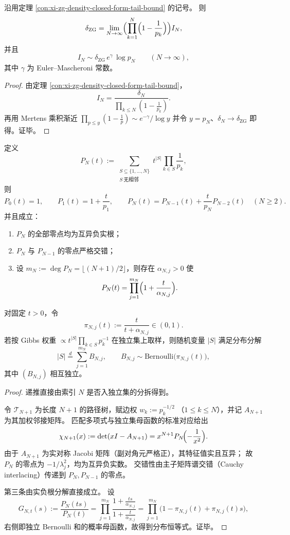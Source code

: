 \begin{corollary}\label{cor:xi-zg-mertens-log-growth}
沿用定理 \ref{con:xi-zg-density-closed-form-tail-bound} 的记号。
则
\[
\delta_{\mathrm{ZG}}
=\lim_{N\to\infty}
\Bigl(\prod_{k=1}^N\Bigl(1-\frac1{p_k}\Bigr)\Bigr)I_N,
\]
并且
\[
I_N\sim \delta_{\mathrm{ZG}}\,e^{\gamma}\,\log p_N
\qquad (N\to\infty),
\]
其中 \(\gamma\) 为 Euler--Mascheroni 常数。
\end{corollary}
\begin{proof}
由定理 \ref{con:xi-zg-density-closed-form-tail-bound}，
\[
I_N=\frac{\delta_N}{\prod_{k\le N}(1-\frac1{p_k})}.
\]
再用 Mertens 乘积渐近
\(
\prod_{p\le y}(1-\frac1p)\sim e^{-\gamma}/\log y
\)
并令 \(y=p_N\)、\(\delta_N\to\delta_{\mathrm{ZG}}\) 即得。证毕。
\end{proof}

\begin{theorem}\label{con:xi-zg-weighted-path-leyang-poisson-binomial}
定义
\[
P_N(t):=\sum_{\substack{S\subseteq\{1,\dots,N\}\\ S\ \mathrm{无相邻}}}
t^{|S|}\prod_{k\in S}\frac1{p_k},
\]
则
\[
P_0(t)=1,\qquad
P_1(t)=1+\frac{t}{p_1},\qquad
P_N(t)=P_{N-1}(t)+\frac{t}{p_N}P_{N-2}(t)\quad(N\ge 2).
\]
并且成立：
\begin{enumerate}
  \item \(P_N\) 的全部零点均为互异负实根；
  \item \(P_N\) 与 \(P_{N-1}\) 的零点严格交错；
  \item 设 \(m_N:=\deg P_N=\lfloor(N+1)/2\rfloor\)，则存在 \(\alpha_{N,j}>0\) 使
  \[
  P_N(t)=\prod_{j=1}^{m_N}\Bigl(1+\frac{t}{\alpha_{N,j}}\Bigr).
  \]
\end{enumerate}
对固定 \(t>0\)，令
\[
\pi_{N,j}(t):=\frac{t}{t+\alpha_{N,j}}\in(0,1).
\]
若按 Gibbs 权重
\(
\propto t^{|S|}\prod_{k\in S}p_k^{-1}
\)
在独立集上取样，则随机变量 \(|S|\) 满足分布分解
\[
|S|\overset{d}{=}\sum_{j=1}^{m_N}B_{N,j},
\qquad
B_{N,j}\sim\mathrm{Bernoulli}\!\bigl(\pi_{N,j}(t)\bigr),
\]
其中 \((B_{N,j})\) 相互独立。
\end{theorem}
\begin{proof}
递推直接由索引 \(N\) 是否入独立集的分拆得到。

令 \(\mathcal T_{N+1}\) 为长度 \(N+1\) 的路径树，赋边权
\(
w_k:=p_k^{-1/2}
\)
（\(1\le k\le N\)），并记 \(A_{N+1}\) 为其加权邻接矩阵。
匹配多项式与独立集母函数的标准对应给出
\[
\chi_{N+1}(x):=\det(xI-A_{N+1})
=x^{N+1}P_N\!\Bigl(-\frac1{x^2}\Bigr).
\]
由于 \(A_{N+1}\) 为实对称 Jacobi 矩阵（副对角元严格正），其特征值实且互异；
故 \(P_N\) 的零点为 \(-1/\lambda_j^2\)，均为互异负实数。
交错性由主子矩阵谱交错（Cauchy interlacing）传递到 \(P_N,P_{N-1}\) 的零点。

第三条由实负根分解直接成立。
设
\[
G_{N,t}(s):=\frac{P_N(ts)}{P_N(t)}
=\prod_{j=1}^{m_N}
\frac{1+\frac{ts}{\alpha_{N,j}}}{1+\frac{t}{\alpha_{N,j}}}
=\prod_{j=1}^{m_N}\bigl(1-\pi_{N,j}(t)+\pi_{N,j}(t)s\bigr),
\]
右侧即独立 Bernoulli 和的概率母函数，故得到分布恒等式。证毕。
\end{proof}

